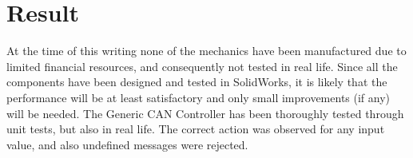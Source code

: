 \section{Result}\label{sec:result}
At the time of this writing none of the mechanics have been manufactured due to limited financial resources, and consequently not tested in real life. Since all the components have been designed and tested in SolidWorks, it is likely that the performance will be at least satisfactory and only small improvements (if any) will be needed. The Generic CAN Controller has been thoroughly tested through unit tests, but also in real life. The correct action was observed for any input value, and also undefined messages were rejected.